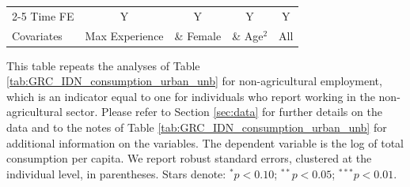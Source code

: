\begin{table}[htbp]
\begin{threeparttable}
\begin{tabular}{l cccc}
\cmidrule{2-5} Time FE & Y & Y & Y & Y \\ Covariates & Max Experience & \& Female & \& Age$^2$ & All \\ \bottomrule \end{tabular} \begin{tablenotes}[flushleft] \footnotesize \item{This table repeats the analyses of Table \ref{tab:GRC_IDN_consumption_urban_unb}  for non-agricultural employment, which is an indicator equal to one for individuals who report working in the non-agricultural sector. Please refer to Section \ref{sec:data} for further details on the data and to the notes of Table \ref{tab:GRC_IDN_consumption_urban_unb} for additional information on the variables. The dependent variable is the log of total consumption per capita. We report robust standard errors, clustered at the individual level, in parentheses. Stars denote: $^{*} p<0.10$; $^{**} p<0.05$; $^{***} p<0.01$.} \end{tablenotes} \end{threeparttable} \end{table}
